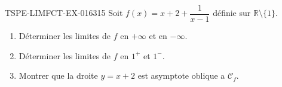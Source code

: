 \begin{exercice}{TSPE-LIMFCT-EX-016}{3}{15}
Soit $f(x) = x + 2 + \dfrac{1}{x-1}$ définie sur $\mathbb{R} \setminus \{1\}$.
\begin{enumerate}
  \item Déterminer les limites de $f$ en $+\infty$ et en $-\infty$.
  \item Déterminer les limites de $f$ en $1^+$ et $1^-$.
  \item Montrer que la droite $y = x+2$ est asymptote oblique a $\mathcal{C}_f$.
\end{enumerate}
\end{exercice}
